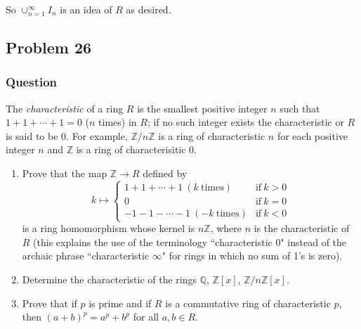 \documentclass[12pt]{article}
\begin{document}
So $  \cup_{n=1}^\infty I_n$ is an idea of $R$ as desired.


\subsection{Problem 26}

\subsubsection{Question}
The \emph{characteristic} of a ring $R$ is the smallest positive integer $n$ such that $1+1+\cdots + 1=0$ ($n$ times) in $R$; if no such integer exists the characteristic or $R$ is said to be 0. For example, $\mathbb{Z}/n\mathbb{Z}$ is a ring of characteristic $n$ for each positive integer $n$ and $\mathbb{Z}$ is a ring of characterisitic 0.
\begin{enumerate}
\item Prove that the map $\mathbb{Z} \to R$ defined by
\[ k \mapsto \left\{ \begin{array}{lr} 1+1+\cdots + 1\ (k \mathrm{\ times}) & \mathrm{if\ } k>0\\ 0 & \mathrm{if\ }k=0 \\ -1-1-\cdots -1\ (-k\mathrm{\ times}) & \mathrm{if\ }k<0\end{array} \right.\]
is a ring homomorphism whose kernel is $n\mathbb{Z}$, where $n$ is the characteristic of $R$ (this explains the use of the terminology ``characteristic 0" instead of the archaic phrase ``characteristic $\infty$" for rings in which no sum of 1's is zero).
\item Determine the characteristic of the rings $\mathbb{Q}$, $\mathbb{Z}[x]$, $\mathbb{Z}/n\mathbb{Z}[x]$.
\item Prove that if $p$ is prime and if $R$ is a commutative ring of characteristic $p$, then $(a+b)^p = a^p+b^p$ for all $a, b \in R$.
\end{enumerate}
\end{document}
